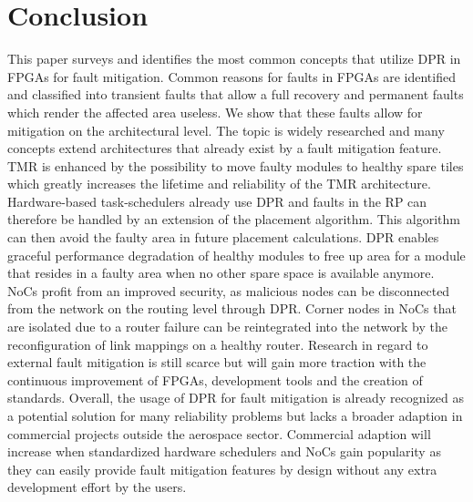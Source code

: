 \section{Conclusion}\label{Conclusion}
This paper surveys and identifies the most common concepts that utilize \gls{DPR} in \glspl{FPGA} for fault mitigation.
Common reasons for faults in \glspl{FPGA} are identified and classified into transient faults that allow a full recovery and permanent faults which render the affected area useless. 
We show that these faults allow for mitigation on the architectural level.
The topic is widely researched and many concepts extend architectures that already exist by a fault mitigation feature.
\gls{TMR} is enhanced by the possibility to move faulty modules to healthy spare tiles which greatly increases the lifetime and reliability of the \gls{TMR} architecture.  
Hardware-based task-schedulers already use \gls{DPR} and faults in the \gls{RP} can therefore be handled by an extension of the placement algorithm.
This algorithm can then avoid the faulty area in future placement calculations.
\gls{DPR} enables graceful performance degradation of healthy modules to free up area for a module that resides in a faulty area when no other spare space is available anymore. 
\glspl{NoC} profit from an improved security, as malicious nodes can be disconnected from the network on the routing level through \gls{DPR}.
Corner nodes in \glspl{NoC} that are isolated due to a router failure can be reintegrated into the network by the reconfiguration of link mappings on a healthy router. 
Research in regard to external fault mitigation is still scarce but will gain more traction with the continuous improvement of \glspl{FPGA}, development tools and the creation of standards.
Overall, the usage of \gls{DPR} for fault mitigation is already recognized as a potential solution for many reliability problems but lacks a broader adaption in commercial projects outside the aerospace sector.
Commercial adaption will increase when standardized hardware schedulers and \glspl{NoC} gain popularity as they can easily provide fault mitigation features by design without any extra development effort by the users.